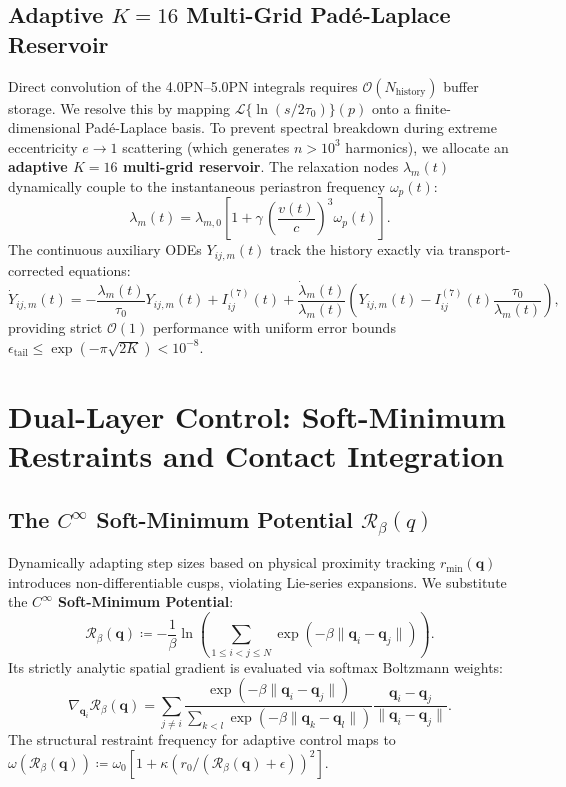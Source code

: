 \documentclass[11pt,a4paper,reqno]{article}
\theoremstyle{plain}
\theoremstyle{definition}
\theoremstyle{remark}
\numberwithin{equation}{section}
\begin{document}
\subsection{Adaptive \texorpdfstring{$K=16$}{K=16} Multi-Grid Padé-Laplace Reservoir}
Direct convolution of the 4.0PN--5.0PN integrals requires $\mathcal{O}(N_{\mathrm{history}})$ buffer storage. We resolve this by mapping $\mathcal{L}\{\ln(s/2\tau_0)\}(p)$ onto a finite-dimensional Padé-Laplace basis. To prevent spectral breakdown during extreme eccentricity $e \to 1$ scattering (which generates $n > 10^3$ harmonics), we allocate an \textbf{adaptive $K=16$ multi-grid reservoir}. 
The relaxation nodes $\lambda_m(t)$ dynamically couple to the instantaneous periastron frequency $\omega_p(t)$:
\begin{equation}
\lambda_m(t) = \lambda_{m, 0} \left[ 1 + \gamma \, \left(\frac{v(t)}{c}\right)^3 \omega_p(t) \right].
\end{equation}
The continuous auxiliary ODEs $Y_{ij, m}(t)$ track the history exactly via transport-corrected equations:
\begin{equation}
\dot{Y}_{ij, m}(t) = -\frac{\lambda_m(t)}{\tau_0} Y_{ij, m}(t) + I_{ij}^{(7)}(t) + \frac{\dot{\lambda}_m(t)}{\lambda_m(t)} \left( Y_{ij, m}(t) - I_{ij}^{(7)}(t) \frac{\tau_0}{\lambda_m(t)} \right),
\end{equation}
providing strict $\mathcal{O}(1)$ performance with uniform error bounds $\epsilon_{\mathrm{tail}} \le \exp(-\pi\sqrt{2K}) < 10^{-8}$.

\bigskip

\section{Dual-Layer Control: Soft-Minimum Restraints and Contact Integration}
\label{sec:contact_control}

\subsection{The \texorpdfstring{$C^\infty$}{C-infinity} Soft-Minimum Potential \texorpdfstring{$\mathcal{R}_\beta(q)$}{R\_beta(q)}}
Dynamically adapting step sizes based on physical proximity tracking $r_{\min}(\bm{q})$ introduces non-differentiable cusps, violating Lie-series expansions. We substitute the \textbf{$C^\infty$ Soft-Minimum Potential}:
\begin{equation}
\mathcal{R}_\beta(\bm{q}) \coloneqq -\frac{1}{\beta} \ln \left( \sum_{1 \le i < j \le N} \exp\left( -\beta \|\bm{q}_i - \bm{q}_j\| \right) \right).
\end{equation}
Its strictly analytic spatial gradient is evaluated via softmax Boltzmann weights:
\begin{equation}
\nabla_{\bm{q}_i} \mathcal{R}_\beta(\bm{q}) = \sum_{j \neq i} \frac{\exp\left(-\beta \|\bm{q}_i - \bm{q}_j\|\right)}{\sum_{k < l} \exp\left(-\beta \|\bm{q}_k - \bm{q}_l\|\right)} \frac{\bm{q}_i - \bm{q}_j}{\|\bm{q}_i - \bm{q}_j\|}.
\end{equation}
The structural restraint frequency for adaptive control maps to $\omega(\mathcal{R}_\beta(\bm{q})) \coloneqq \omega_0 [ 1 + \kappa ( r_0 / (\mathcal{R}_\beta(\bm{q}) + \epsilon) )^2 ]$.
\end{document}
